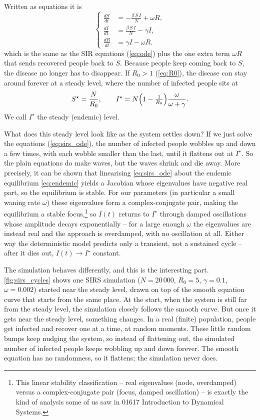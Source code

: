 \noindent Written as equations it is
\begin{equation}
  \left\{
  \begin{aligned}
    \frac{dS}{dt} &= -\frac{\beta\,S\,I}{N} + \omega R,\\[4pt]
    \frac{dI}{dt} &= \frac{\beta\,S\,I}{N} - \gamma I,\\[4pt]
    \frac{dR}{dt} &= \gamma I - \omega R.
  \end{aligned}
  \right.
  \label{eq:sirs_ode}
\end{equation}
which is the same as the SIR equations (\autoref{eq:ode}) plus the one extra term
$\omega R$ that sends recovered people back to $S$. Because people keep coming
back to $S$, the disease no longer has to disappear. If $R_0>1$
(\autoref{eq:R0}), the disease can stay around forever at a steady level, where
the number of infected people sits at
\begin{equation}
  S^\star = \frac{N}{R_0},
  \qquad
  I^\star = N\Bigl(1-\tfrac{1}{R_0}\Bigr)\frac{\omega}{\omega+\gamma}.
  \label{eq:endemic}
\end{equation}
We call $I^\star$ the steady (endemic) level.

What does this steady level look like as the system settles down? If we just
solve the equations (\autoref{eq:sirs_ode}), the number of infected people
wobbles up and down a few times, with each wobble smaller than the last, until it
flattens out at $I^\star$. So the plain equations do make waves, but the waves
shrink and die away. More precisely, it can be shown that linearising
\autoref{eq:sirs_ode} about the endemic equilibrium \eqref{eq:endemic} yields a
Jacobian whose eigenvalues have negative real part, so the equilibrium is stable.
For our parameters (in particular a small waning rate $\omega$) these eigenvalues
form a complex-conjugate pair, making the equilibrium a stable
focus,\footnote{This linear stability classification -- real eigenvalues
(node, overdamped) versus a complex-conjugate pair (focus, damped oscillation) --
is exactly the kind of analysis some of us saw in 01617 Introduction to Dynamical
Systems.} so $I(t)$
returns to $I^\star$ through damped oscillations whose amplitude decays
exponentially -- for a large enough $\omega$ the eigenvalues are instead real and
the approach is overdamped, with no oscillation at all. Either way the
deterministic model predicts only a transient, not a sustained cycle -- after it
dies out, $I(t)\to I^\star$ constant.

The simulation behaves differently, and this is the interesting part.
\autoref{fig:sirs_cycles} shows one SIRS simulation ($N=20\,000$, $R_0=5$,
$\gamma=0.1$, $\omega=0.002$) started near the steady level, drawn on top of the
smooth equation curve that starts from the same place. At the start, when the
system is still far from the steady level, the simulation closely follows the
smooth curve. But once it gets near the steady level, something changes. In a real
(finite) population, people get infected and recover one at a time, at random
moments. These little random bumps keep nudging the system, so instead of
flattening out, the simulated number of infected people keeps wobbling up and down
forever. The smooth equation has no randomness, so it flattens; the simulation
never does.

